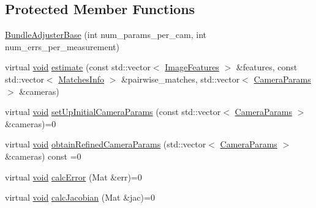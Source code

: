 \subsection*{Protected Member Functions}
\begin{DoxyCompactItemize}
\item 
\hyperlink{classcv_1_1detail_1_1BundleAdjusterBase_a6b2709dce0e39413fa988dc5c0ffc47b}{Bundle\-Adjuster\-Base} (int num\-\_\-params\-\_\-per\-\_\-cam, int num\-\_\-errs\-\_\-per\-\_\-measurement)
\item 
virtual \hyperlink{legacy_8hpp_a8bb47f092d473522721002c86c13b94e}{void} \hyperlink{classcv_1_1detail_1_1BundleAdjusterBase_aca5cf5f89209c511b44c0ea962b76a54}{estimate} (const std\-::vector$<$ \hyperlink{structcv_1_1detail_1_1ImageFeatures}{Image\-Features} $>$ \&features, const std\-::vector$<$ \hyperlink{structcv_1_1detail_1_1MatchesInfo}{Matches\-Info} $>$ \&pairwise\-\_\-matches, std\-::vector$<$ \hyperlink{structcv_1_1detail_1_1CameraParams}{Camera\-Params} $>$ \&cameras)
\item 
virtual \hyperlink{legacy_8hpp_a8bb47f092d473522721002c86c13b94e}{void} \hyperlink{classcv_1_1detail_1_1BundleAdjusterBase_a7d3b589d7502dd18a1d1dad898816b2e}{set\-Up\-Initial\-Camera\-Params} (const std\-::vector$<$ \hyperlink{structcv_1_1detail_1_1CameraParams}{Camera\-Params} $>$ \&cameras)=0
\item 
virtual \hyperlink{legacy_8hpp_a8bb47f092d473522721002c86c13b94e}{void} \hyperlink{classcv_1_1detail_1_1BundleAdjusterBase_aae756bac56334dea76d4064c6a32c1a9}{obtain\-Refined\-Camera\-Params} (std\-::vector$<$ \hyperlink{structcv_1_1detail_1_1CameraParams}{Camera\-Params} $>$ \&cameras) const =0
\item 
virtual \hyperlink{legacy_8hpp_a8bb47f092d473522721002c86c13b94e}{void} \hyperlink{classcv_1_1detail_1_1BundleAdjusterBase_a915c63bff1eb2097710d0cf95f2b9784}{calc\-Error} (Mat \&err)=0
\item 
virtual \hyperlink{legacy_8hpp_a8bb47f092d473522721002c86c13b94e}{void} \hyperlink{classcv_1_1detail_1_1BundleAdjusterBase_a2d09d69ec01cd5f4967ed861230f9c45}{calc\-Jacobian} (Mat \&jac)=0
\end{DoxyCompactItemize}
